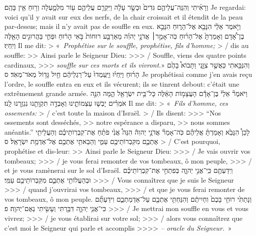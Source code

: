 \begin{paracol}[1]
  \verset
  {וְרָאִ֜יתִי
    וְהִנֵּֽה־עֲלֵיהֶ֤ם גִּדִים֙
    וּבָשָׂ֣ר עָלָ֔ה
    וַיִּקְרַ֧ם עֲלֵיהֶ֛ם ע֖וֹר מִלְמָ֑עְלָה
    וְר֖וּחַ אֵ֥ין בָּהֶֽם׃}
  {Je regardai:
    voici qu’il y avait sur eux des nerfs,
    de la chair croissait
    et il étendit de la peau par-dessus;
    mais il n’y avait pas de souffle en eux.}
  \verseSpace
  \verset
  {וַיֹּ֣אמֶר אֵלַ֔י
    הִנָּבֵ֖א אֶל־הָר֑וּחַ הִנָּבֵ֣א בֶן־אָ֠דָם
    וְאָמַרְתָּ֙ אֶל־הָר֜וּחַ
    כֹּֽה־אָמַ֣ר׀ אֲדֹנָ֣י יְהוִ֗ה
    מֵאַרְבַּ֤ע רוּחוֹת֙ בֹּ֣אִי
    הָר֔וּחַ וּפְחִ֛י בַּהֲרוּגִ֥ים הָאֵ֖לֶּה וְיִֽחְיֽוּ׃}
  {Il me dit:
    > «~\textit{Prophétise sur le souffle, prophétise, fils d’homme;}
    > / dis au souffle:
    >> Ainsi parle le Seigneur Dieu:
    >>> / Souffle, viens des quatre points cardinaux,
    >>> \textit{souffle sur ces morts et ils vivront.}»}
  \verset
  {וְהִנַּבֵּ֖אתִי כַּאֲשֶׁ֣ר צִוָּ֑נִי
    וַתָּבוֹא֩ בָהֶ֙ם הָר֜וּחַ וַיִּֽחְי֗וּ
    וַיַּֽעַמְדוּ֙ עַל־רַגְלֵיהֶ֔ם
    חַ֖יִל גָּד֥וֹל מְאֹד־מְאֹֽד׃ ס}
  {Je prophétisai comme j’en avais reçu l’ordre,
    le souffle entra en eux et ils vécurent;
    ils se tinrent debout:
    c’était une extrêmement grande armée.}
  \clearpage
  \verset
  {וַיֹּאמֶר֘ אֵלַי֒
    בֶּן־אָדָ֕ם הָעֲצָמ֣וֹת הָאֵ֔לֶּה
    כָּל־בֵּ֥ית יִשְׂרָאֵ֖ל הֵ֑מָּה
    הִנֵּ֣ה אֹמְרִ֗ים
    יָבְשׁ֧וּ עַצְמוֹתֵ֛ינוּ
    וְאָבְדָ֥ה תִקְוָתֵ֖נוּ
    נִגְזַ֥רְנוּ לָֽנוּ׃}
  {Il me dit:
    > «~\textit{Fils d’homme, ces ossements:}
    > / c’est toute la maison d’Israël.
    > / Ils disent:
    >>> “Nos ossements sont desséchés,
    >> notre espérance a disparu,
    >> nous sommes anéantis.”}
  \verset
  {לָכֵן֩ הִנָּבֵ֙א וְאָמַרְתָּ֜ אֲלֵיהֶ֗ם
    כֹּֽה־אָמַר֘ אֲדֹנָ֣י יְהוִה֒
    הִנֵּה֩ אֲנִ֙י פֹתֵ֜חַ אֶת־קִבְרֽוֹתֵיכֶ֗ם
    וְהַעֲלֵיתִ֥י אֶתְכֶ֛ם מִקִּבְרוֹתֵיכֶ֖ם עַמִּ֑י
    וְהֵבֵאתִ֥י אֶתְכֶ֖ם אֶל־אַדְמַ֥ת יִשְׂרָאֵֽל׃ ס}
  {> / C’est pourquoi, prophétise et dis-leur:
    >> Ainsi parle le Seigneur Dieu:
    >>> / Je vais ouvrir vos tombeaux;
    >>> / je vous ferai remonter de vos tombeaux, ô mon peuple,
    >>> / et je vous ramènerai sur le sol d’Israël.}
  \verset
  {וִֽידַעְתֶּ֖ם כִּֽי־אֲנִ֣י יְהוָ֑ה
    בְּפִתְחִ֣י אֶת־קִבְרֽוֹתֵיכֶ֗ם
    וּבְהַעֲלוֹתִ֥י אֶתְכֶ֛ם מִקִּבְרוֹתֵיכֶ֖ם עַמִּֽי׃}
  {>>> / Vous connaîtrez que je suis le Seigneur
    >>> / quand j’ouvrirai vos tombeaux,
    >>> / et que je vous ferai remonter de vos tombeaux, ô mon peuple.}
  \verset
  {וְנָתַתִּ֙י רוּחִ֤י בָכֶם֙ וִחְיִיתֶ֔ם
    וְהִנַּחְתִּ֥י אֶתְכֶ֖ם עַל־אַדְמַתְכֶ֑ם
    וִידַעְתֶּ֞ם כִּי־אֲנִ֧י יְהוָ֛ה דִּבַּ֥רְתִּי וְעָשִׂ֖יתִי
    נְאֻם־יְהוָֽה׃ פ}
  {>>> / Je mettrai mon souffle en vous et vous vivrez;
    >>> / je vous établirai sur votre sol;
    >>> / alors vous connaîtrez que c’est moi le Seigneur qui parle et accomplis
    >>>> \textit{– oracle du Seigneur.}~»}
  \parSpace

\end{paracol}
